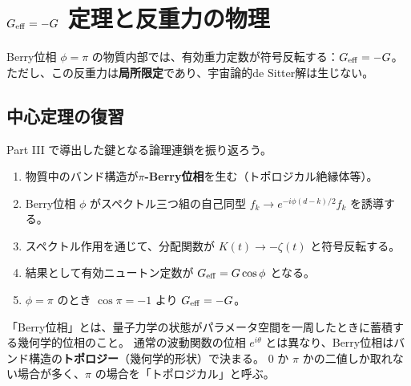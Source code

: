 
\chapter{$G_{\mathrm{eff}} = -G$ 定理と反重力の物理}
\label{ch:antigravity}

\begin{keyresult}[本章の主題]
Berry位相 $\phi = \pi$ の物質内部では、有効重力定数が符号反転する：$G_{\mathrm{eff}} = -G$。
ただし、この反重力は\textbf{局所限定}であり、宇宙論的de Sitter解は生じない。
\end{keyresult}

\section{中心定理の復習}
\label{sec:11.1}

Part III で導出した鍵となる論理連鎖を振り返ろう。

\begin{enumerate}[label=(\arabic*)]
  \item 物質中のバンド構造が\textbf{$\pi$-Berry位相}を生む（トポロジカル絶縁体等）。
  \item Berry位相 $\phi$ がスペクトル三つ組の自己同型 $f_k \to e^{-i\phi(d-k)/2}f_k$ を誘導する。
  \item スペクトル作用を通じて、分配関数が $K(t) \to -\zeta(t)$ と符号反転する。
  \item 結果として有効ニュートン定数が $G_{\mathrm{eff}} = G\cos\phi$ となる。
  \item $\phi = \pi$ のとき $\cos\pi = -1$ より $G_{\mathrm{eff}} = -G$。
\end{enumerate}

\begin{hsbox}
「Berry位相」とは、量子力学の状態がパラメータ空間を一周したときに蓄積する幾何学的位相のこと。
通常の波動関数の位相 $e^{i\theta}$ とは異なり、Berry位相はバンド構造の\textbf{トポロジー}（幾何学的形状）で決まる。
$0$ か $\pi$ かの二値しか取れない場合が多く、$\pi$ の場合を「トポロジカル」と呼ぶ。
\end{hsbox}

